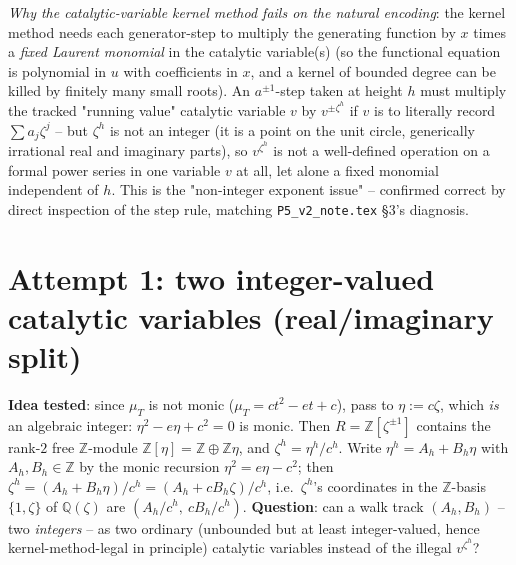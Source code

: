 \documentclass[11pt]{article}
\newcommand{\Q}{\mathbb Q}
\newcommand{\Z}{\mathbb Z}
\begin{document}
\emph{Why the catalytic-variable kernel method fails on the natural encoding}: the kernel method
needs each generator-step to multiply the generating function by $x$ times a \emph{fixed Laurent
monomial} in the catalytic variable(s) (so the functional equation is polynomial in $u$ with
coefficients in $x$, and a kernel of bounded degree can be killed by finitely many small roots). An
$a^{\pm1}$-step taken at height $h$ must multiply the tracked "running value" catalytic variable
$v$ by $v^{\pm\zeta^h}$ if $v$ is to literally record $\sum a_j\zeta^j$ -- but $\zeta^h$ is not an
integer (it is a point on the unit circle, generically irrational real and imaginary parts), so
$v^{\zeta^h}$ is not a well-defined operation on a formal power series in one variable $v$ at all,
let alone a fixed monomial independent of $h$. This is the "non-integer exponent issue" -- confirmed
correct by direct inspection of the step rule, matching \texttt{P5\_v2\_note.tex} \S3's diagnosis.

\section{Attempt 1: two integer-valued catalytic variables (real/imaginary split)}

\textbf{Idea tested}: since $\mu_T$ is not monic ($\mu_T=ct^2-et+c$), pass to $\eta:=c\zeta$, which
\emph{is} an algebraic integer: $\eta^2-e\eta+c^2=0$ is monic. Then $R=\Z[\zeta^{\pm1}]$ contains the
rank-$2$ free $\Z$-module $\Z[\eta]=\Z\oplus\Z\eta$, and $\zeta^h=\eta^h/c^h$. Write
$\eta^h=A_h+B_h\eta$ with $A_h,B_h\in\Z$ by the monic recursion $\eta^2=e\eta-c^2$; then
$\zeta^h=(A_h+B_h\eta)/c^h=(A_h+cB_h\zeta)/c^h$, i.e.\ $\zeta^h$'s coordinates in the $\Z$-basis
$\{1,\zeta\}$ of $\Q(\zeta)$ are $(A_h/c^h,\ cB_h/c^h)$. \textbf{Question}: can a walk track
$(A_h,B_h)$ -- two \emph{integers} -- as two ordinary (unbounded but at least integer-valued, hence
kernel-method-legal in principle) catalytic variables instead of the illegal $v^{\zeta^h}$?
\end{document}
